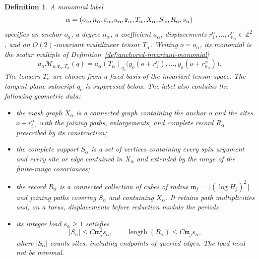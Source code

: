 \documentclass[11pt]{article}
\numberwithin{equation}{section}
\newtheorem{definition}[theorem]{Definition}
\theoremstyle{definition}
\theoremstyle{plain}
\begin{document}
\begin{definition}
A monomial label 
\begin{equation}
\alpha = (o_\alpha,n_\alpha,\varepsilon_\alpha,a_\alpha,{\bf r}_\alpha,T_\alpha, X_\alpha, S_\alpha, R_\alpha,s_\alpha)
\end{equation}
specifies an anchor $o_\alpha$, a degree $n_\alpha$, a coefficient
$a_\alpha$, displacements $r_1^\alpha,\ldots,r_{n_\alpha}^\alpha\in\mathbb Z^2$, and an
$O(2)$-invariant multilinear tensor $T_\alpha$.  Writing $o=o_\alpha$,
its monomial is the scalar multiple of
Definition~\ref{def:anchored-invariant-monomial}
\begin{equation}
 a_\alpha\mathcal M_{o,\mathbf r_\alpha,T_\alpha}(q)
 =a_\alpha (T_\alpha)_{q_o}
    \bigl(y_o(o+r_1^\alpha),\ldots,y_o(o+r_{n_\alpha}^\alpha)\bigr).
\end{equation}
The tensors $T_\alpha$ are chosen from a fixed basis of the invariant tensor space.
The tangent-plane subscript $q_o$ is suppressed below.
The label also contains the following geometric data:
\begin{itemize}
\item the mask graph $X_\alpha$ is a connected graph
containing the anchor $o$ and the sites $o+r_i^\alpha$, with the
joining paths, enlargements, and complete record $R_\alpha$ prescribed by its construction;
%
\item the complete support $S_\alpha$ is a set of vertices containing every spin
argument and every site or edge contained in $X_\alpha$ and extended by the range of the finite-range covariances;
\item
the record $R_\alpha$ is a connected collection of cubes of radius
$\mathfrak m_j=\lceil(\log H_j)^2\rceil$ and joining paths covering
$S_\alpha$ and containing $X_\alpha$.  It retains path multiplicities
and, on a torus, displacements before reduction modulo the periods
\item its integer load $s_\alpha\ge1$ satisfies
\begin{equation}
 |S_\alpha|\le C\mathfrak m_j^2s_\alpha,
 \qquad
 \operatorname{length}(R_\alpha)\le C\mathfrak m_js_\alpha,
\end{equation}
where $|S_\alpha|$ counts sites, including endpoints of queried edges.
The load need not be minimal.
\end{itemize}
\end{definition}

\end{document}
